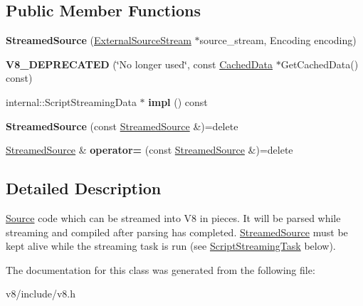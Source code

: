 \subsection*{Public Member Functions}
\begin{DoxyCompactItemize}
\item 
\mbox{\label{classv8_1_1ScriptCompiler_1_1StreamedSource_a4da404a49e48a12927c743797833d8aa}} 
{\bfseries Streamed\+Source} (\mbox{\hyperlink{classv8_1_1ScriptCompiler_1_1ExternalSourceStream}{External\+Source\+Stream}} $\ast$source\+\_\+stream, Encoding encoding)
\item 
\mbox{\label{classv8_1_1ScriptCompiler_1_1StreamedSource_a1aa7e890f0694cc3ed9b419fdb5d71e4}} 
{\bfseries V8\+\_\+\+D\+E\+P\+R\+E\+C\+A\+T\+ED} (\char`\"{}No longer used\char`\"{}, const \mbox{\hyperlink{structv8_1_1ScriptCompiler_1_1CachedData}{Cached\+Data}} $\ast$Get\+Cached\+Data() const)
\item 
\mbox{\label{classv8_1_1ScriptCompiler_1_1StreamedSource_a45714bf012e619379d70707b535c8224}} 
internal\+::\+Script\+Streaming\+Data $\ast$ {\bfseries impl} () const
\item 
\mbox{\label{classv8_1_1ScriptCompiler_1_1StreamedSource_ac0024da49305c2d8de1a61348c1c8880}} 
{\bfseries Streamed\+Source} (const \mbox{\hyperlink{classv8_1_1ScriptCompiler_1_1StreamedSource}{Streamed\+Source}} \&)=delete
\item 
\mbox{\label{classv8_1_1ScriptCompiler_1_1StreamedSource_ab2425dcd427fcdfaf6ac0d0cd295bcbb}} 
\mbox{\hyperlink{classv8_1_1ScriptCompiler_1_1StreamedSource}{Streamed\+Source}} \& {\bfseries operator=} (const \mbox{\hyperlink{classv8_1_1ScriptCompiler_1_1StreamedSource}{Streamed\+Source}} \&)=delete
\end{DoxyCompactItemize}


\subsection{Detailed Description}
\mbox{\hyperlink{classv8_1_1ScriptCompiler_1_1Source}{Source}} code which can be streamed into V8 in pieces. It will be parsed while streaming and compiled after parsing has completed. \mbox{\hyperlink{classv8_1_1ScriptCompiler_1_1StreamedSource}{Streamed\+Source}} must be kept alive while the streaming task is run (see \mbox{\hyperlink{classv8_1_1ScriptCompiler_1_1ScriptStreamingTask}{Script\+Streaming\+Task}} below). 

The documentation for this class was generated from the following file\+:\begin{DoxyCompactItemize}
\item 
v8/include/v8.\+h\end{DoxyCompactItemize}
